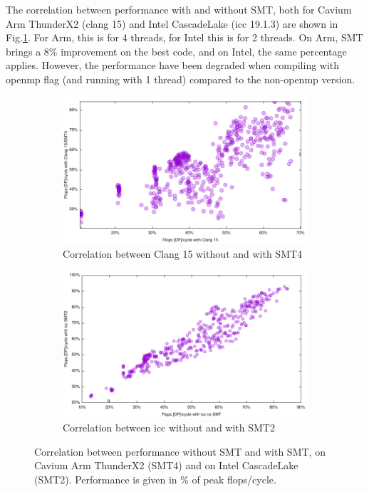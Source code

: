 \documentclass{article}
\begin{document}
The correlation between performance with and without SMT, both for Cavium Arm ThunderX2 (clang 15) and Intel CascadeLake (icc 19.1.3) are shown in Fig.\ref{fig:SMT}. For Arm, this is for 4 threads, for Intel this is for 2 threads. On Arm, SMT brings a $8\%$ improvement on the best code, and on Intel, the same percentage applies. However, the performance have been degraded when compiling with openmp flag (and running with 1 thread) compared to the non-openmp version.
\begin{figure}[h!]
  \begin{subfigure}[h]{0.45\textwidth}  
\includegraphics[width=\textwidth]{../benches/gemm/arm-64x256x64/clangxsmt.pdf}
  \caption{Correlation between Clang 15 without and with SMT4}
  \end{subfigure}
    \begin{subfigure}[h]{0.45\textwidth}  
\includegraphics[width=\textwidth]{../benches/gemm/cascadelake-64x256x64/icc1thx2th.pdf}
  \caption{Correlation between icc without and with SMT2}
    \end{subfigure}
    \caption{Correlation between performance without SMT and with SMT, on Cavium Arm ThunderX2 (SMT4) and on Intel CascadeLake (SMT2). Performance is given in \% of peak flops/cycle. \label{fig:SMT}}
\end{figure}
\end{document}
